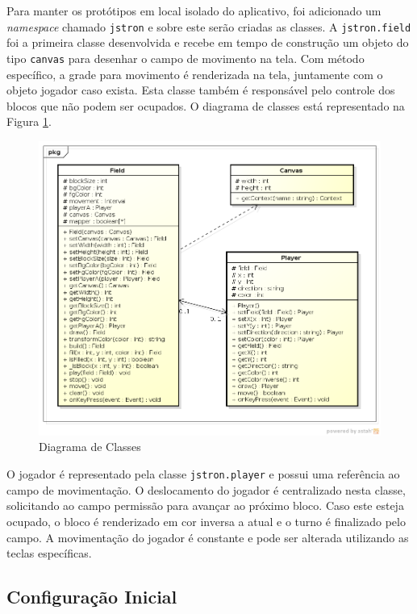 \documentclass{article}
\begin{document}
Para manter os protótipos em local isolado do aplicativo, foi adicionado um
\emph{namespace} chamado \texttt{jstron} e sobre este serão criadas as classes.
A \texttt{jstron.field} foi a primeira classe desenvolvida e recebe em tempo de
construção um objeto do tipo \texttt{canvas} para desenhar o campo de movimento
na tela. Com método específico, a grade para movimento é renderizada na tela,
juntamente com o objeto jogador caso exista. Esta classe também é responsável
pelo controle dos blocos que não podem ser ocupados. O diagrama de classes está
representado na Figura \ref{fig:diagram}.

\begin{figure}
    \centering{}
    \includegraphics[scale=0.5]{class-diagram.png}
    \caption{Diagrama de Classes}
    \label{fig:diagram}
\end{figure}

O jogador é representado pela classe \texttt{jstron.player} e possui uma
referência ao campo de movimentação. O deslocamento do jogador é centralizado
nesta classe, solicitando ao campo permissão para avançar ao próximo bloco. Caso
este esteja ocupado, o bloco é renderizado em cor inversa a atual e o turno é
finalizado pelo campo. A movimentação do jogador é constante e pode ser alterada
utilizando as teclas específicas.

\subsection{Configuração Inicial}
\end{document}
